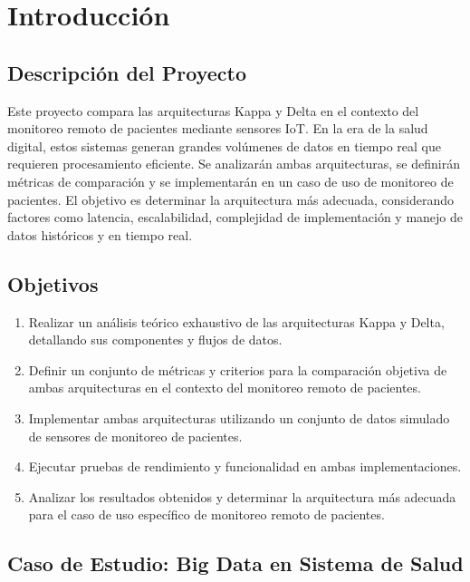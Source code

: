 \chapter{Introducción}


\section{Descripción del Proyecto}

Este proyecto compara las arquitecturas Kappa y Delta en el contexto del monitoreo remoto de pacientes mediante sensores IoT. En la era de la salud digital, estos sistemas generan grandes volúmenes de datos en tiempo real que requieren procesamiento eficiente. Se analizarán ambas arquitecturas, se definirán métricas de comparación y se implementarán en un caso de uso de monitoreo de pacientes. El objetivo es determinar la arquitectura más adecuada, considerando factores como latencia, escalabilidad, complejidad de implementación y manejo de datos históricos y en tiempo real.

\newpage

\section{Objetivos}

\begin{enumerate}
    \item Realizar un análisis teórico exhaustivo de las arquitecturas Kappa y Delta, detallando sus componentes y flujos de datos.
    
    \item Definir un conjunto de métricas y criterios para la comparación objetiva de ambas arquitecturas en el contexto del monitoreo remoto de pacientes.
    
    \item Implementar ambas arquitecturas utilizando un conjunto de datos simulado de sensores de monitoreo de pacientes.
    
    \item Ejecutar pruebas de rendimiento y funcionalidad en ambas implementaciones.
    
    \item Analizar los resultados obtenidos y determinar la arquitectura más adecuada para el caso de uso específico de monitoreo remoto de pacientes.
\end{enumerate}

\newpage

\section{Caso de Estudio: Big Data en Sistema de Salud}

